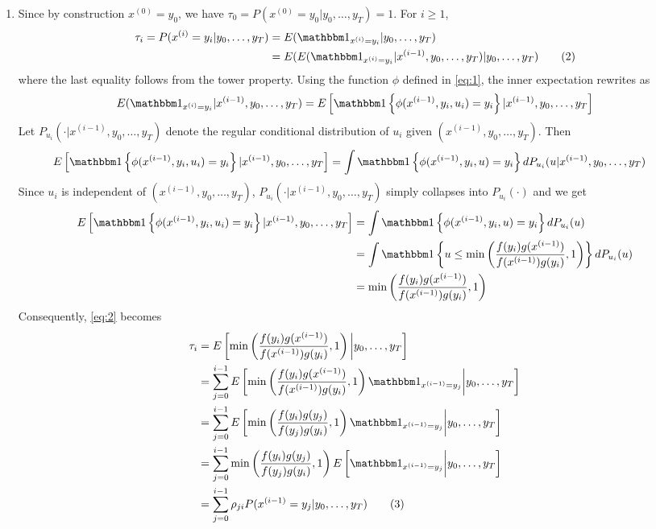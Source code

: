 \documentclass[a4paper,11pt, hidelinks]{article}
\begin{document}
\begin{enumerate}[label=(\alph*)]
    \item Since by construction $x^{(0)} =y_0$, we have $\tau_0 = P(x^{(0)} =y_0|y_0,\ldots,y_T) =1$. For $i\geq 1$, \begin{align*}
        \tau_i = P(x^{(i)} =y_i|y_0,\ldots,y_T) &= E(\mathbbm 1_{x^{(i)} =y_i} | y_0,\ldots,y_T)\\
        &= E(E(\mathbbm 1_{x^{(i)} =y_i} |x^{(i-1)},y_0,\ldots,y_T)| y_0,\ldots,y_T) \tag{2}\label{eq:2}\\
    \end{align*}
    where the last equality follows from the tower property.
    Using the function $\phi$ defined in \eqref{eq:1}, the inner expectation rewrites as $$E(\mathbbm 1_{x^{(i)} =y_i} |x^{(i-1)},y_0,\ldots,y_T) = E\left[\mathbbm 1 \left\{\phi(x^{(i-1)}, y_i, u_i) =y_i \right\} |x^{(i-1)},y_0,\ldots,y_T\right]$$
    Let $P_{u_i}(\cdot|x^{(i-1)},y_0,\ldots,y_T)$ denote the regular conditional distribution of $u_i$ given $(x^{(i-1)},y_0,\ldots,y_T)$. Then $$\begin{aligned}
    E\left[\mathbbm 1 \left\{\phi(x^{(i-1)}, y_i, u_i) =y_i \right\} |x^{(i-1)},y_0,\ldots,y_T\right] &= 
        \int \mathbbm 1 \left\{\phi(x^{(i-1)}, y_i, u) =y_i \right\} dP_{u_i}(u|x^{(i-1)},y_0,\ldots,y_T)
    \end{aligned}$$
    Since $u_i$ is independent of $(x^{(i-1)},y_0,\ldots,y_T)$, $P_{u_i}(\cdot|x^{(i-1)},y_0,\ldots,y_T)$ simply collapses into $P_{u_i}(\cdot)$ and we get $$\begin{aligned}
    E\left[\mathbbm 1 \left\{\phi(x^{(i-1)}, y_i, u_i) =y_i \right\} |x^{(i-1)},y_0,\ldots,y_T\right] &= 
        \int \mathbbm 1 \left\{\phi(x^{(i-1)}, y_i, u) =y_i \right\} dP_{u_i}(u)\\
        &= \int \mathbbm 1 \left\{u\leq \min \left(\frac{f(y_i)g(x^{(i-1)})}{f(x^{(i-1)})g(y_i)},1 \right) \right\} dP_{u_i}(u)\\
        &= \min \left(\frac{f(y_i)g(x^{(i-1)})}{f(x^{(i-1)})g(y_i)},1 \right)\\
    \end{aligned}$$
    Consequently, \eqref{eq:2} becomes \begin{align*}
        \tau_i &= E\left[ \min \left(\frac{f(y_i)g(x^{(i-1)})}{f(x^{(i-1)})g(y_i)},1 \right) \bigg| y_0,\ldots,y_T\right]\\
        &= \sum_{j=0}^{i-1} E\left[ \min \left(\frac{f(y_i)g(x^{(i-1)})}{f(x^{(i-1)})g(y_i)},1 \right) \mathbbm 1_{x^{(i-1)}=y_j}\bigg| y_0,\ldots,y_T\right]\\
        &= \sum_{j=0}^{i-1} E\left[ \min \left(\frac{f(y_i)g(y_j)}{f(y_j)g(y_i)},1 \right) \mathbbm 1_{x^{(i-1)}=y_j}\bigg| y_0,\ldots,y_T\right]\\
        &= \sum_{j=0}^{i-1} \min \left(\frac{f(y_i)g(y_j)}{f(y_j)g(y_i)},1 \right) E\left[ \mathbbm 1_{x^{(i-1)}=y_j}\bigg| y_0,\ldots,y_T\right]\\
        &= \sum_{j=0}^{i-1} \rho_{ji} P(x^{(i-1)}=y_j| y_0,\ldots,y_T) \tag{3}\label{eq:3}
    \end{align*}


\end{enumerate}
\end{document}
